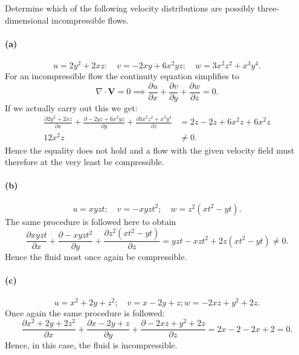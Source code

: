
Determine which of the following velocity distributions are possibly three-dimensional incompressible flows.

\paragraph{(a)}
\[ 
u = 2 y^2 + 2xz: \quad v = -2xy + 6x^2 yz; \quad w = 3x^2z^2 + x^3y^{4}
.\]
\bigbreak
For an incompressible flow the continuity equation simplifies to
\[ 
\nabla \cdot \textbf{V} = 0 \implies \frac{\partial u}{\partial x} + \frac{\partial v}{\partial y} + \frac{\partial w}{\partial z} = 0
.\]
If we actually carry out this we get:
\begin{align*}
  \frac{\partial 2y^2 + 2xz}{\partial x} + \frac{\partial -2yz + 6x^2 yz}{\partial y} + \frac{\partial 3x^2 z^2 + x^3 y^{4}}{\partial z} &= 2z - 2z + 6x^2z + 6x^2z \\
  12x^2 z &\neq 0
.\end{align*}
Hence the equality does not hold and a flow with the given velocity field must therefore at the very least be compressible. 

\paragraph{(b)}
\[ 
u = xyzt; \quad v = -xyzt^2; \quad w = z^2 \left( xt^2 - yt \right)
.\]
\bigbreak
The same procedure is followed here to obtain
\[
  \frac{\partial xyzt}{\partial x} + \frac{\partial -xyzt^2}{\partial y} + \frac{\partial z^2 \left( xt^2 - yt \right)}{\partial z} = yzt - xzt^2 + 2z \left( xt^2 - yt \right) \neq 0
.\]
Hence the fluid most once again be compressible. 

\paragraph{(c)}
\[ 
u = x^2 + 2 y + z^2; \quad v = x - 2y + z; w = -2xz + y^2 + 2z
.\]
\bigbreak
Once again the same procedure is followed:
\[
  \frac{\partial x^2 + 2y + 2z^2}{\partial x} + \frac{\partial x - 2y + z}{\partial y} + \frac{\partial -2xz + y^2 + 2z}{\partial z} = 2x - 2 -2x + 2 = 0
.\]
Hence, in this case, the fluid is incompressible.


